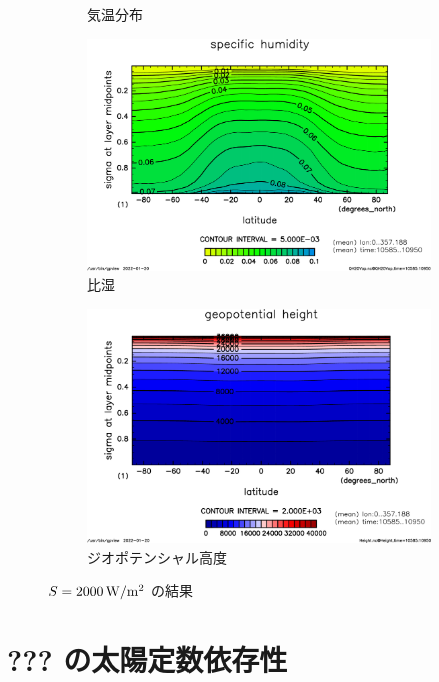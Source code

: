 \documentclass[body]{subfiles}
\begin{document}
\begin{figure}[t]
\begin{subfigure}{.4\textwidth}
		\caption{気温分布}
	\end{subfigure}
	\begin{subfigure}{.4\textwidth}
		\centering
		\includegraphics[width=\columnwidth]{S2000/QH2OVap,time=10585:10950-crop-rotate.pdf}
		\caption{比湿}
	\end{subfigure}
	\begin{subfigure}{.4\textwidth}
		\centering
		\includegraphics[width=\columnwidth]{S2000/Height,time=10585:10950-crop-rotate.pdf}
		\caption{ジオポテンシャル高度}
	\end{subfigure}
	\caption{
		\(S=2000\hmu{W/m^2}\) の結果
	}
\end{figure}

\section{??? の太陽定数依存性}
\end{document}
